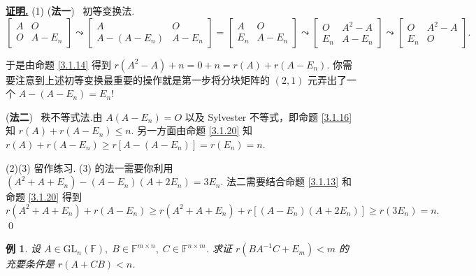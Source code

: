 \documentclass[10pt,openany]{article}
\theoremstyle{thmstyle} %
\theoremstyle{defstyle} %
\theoremstyle{prostyle} %
\theoremstyle{exastyle}
\newtheorem{example}[theorem]{例}
\theoremstyle{remstyle}
\renewenvironment{proof}[1][证明]{\par\underline{\textbf{#1.}} \;\fangsong}{\qed\par}
\newcommand{\F}{\mathbb{F}}
\newcommand{\gfn}{\text{GL}_n(\mathbb{F})}
\newcommand{\mn}{^{m \times n}}
\newcommand{\nm}{^{n \times m}}
\begin{document}
\begin{proof}
	(1) (\textbf{法一}) \ 初等变换法.
	\[ \begin{bmatrix}
		A & O \\ O & A-E_n 
	\end{bmatrix} \leadsto \begin{bmatrix}
	A & O \\ A-(A-E_n) & A-E_n 
	\end{bmatrix}=\begin{bmatrix}
	A & O \\ E_n & A-E_n 
	\end{bmatrix} \leadsto \begin{bmatrix}
	O & A^2-A \\ E_n & A-E_n 
	\end{bmatrix} \leadsto \begin{bmatrix}
	O & A^2-A \\ E_n & O 
	\end{bmatrix}. \]
	
	于是由命题 \ref{3.1.14} 得到 \( r(A^2-A)+n=0+n=r(A)+r(A-E_n) \). 你需要注意到上述初等变换最重要的操作就是第一步将分块矩阵的 \( (2,1)\) 元弄出了一个 \( A-(A-E_n)=E_n \)!
	
	\vspace{1ex}
	
	(\textbf{法二}) \ 秩不等式法.由 \( A(A-E_n)=O \) 以及 Sylvester 不等式，即命题 \ref{3.1.16} 知 \( r(A)+r(A-E_n) \leq n \). 另一方面由命题 \ref{3.1.20} 知 \( r(A)+r(A-E_n) \geq r[A-(A-E_n)]=r(E_n)=n \).
	
	\vspace{1ex}
	
	(2)(3) 留作练习. (3) 的法一需要你利用 \( (A^2+A+E_n)-(A-E_n)(A+2E_n)=3E_n \). 法二需要结合命题 \ref{3.1.13} 和命题 \ref{3.1.20} 得到
	\[ r(A^2+A+E_n)+r(A-E_n) \geq r(A^2+A+E_n)+r[(A-E_n)(A+2E_n)] \geq r(3E_n)=n. \]
\end{proof}

\begin{example} \label{3.1.23}
	设 \( A \in \gfn, \; B \in \F\mn, \; C \in \F\nm \). 求证  
	\( r(BA^{-1}C + E_m) < m \) 的充要条件是 \( r(A + CB) < n \).
\end{example}
\end{document}
